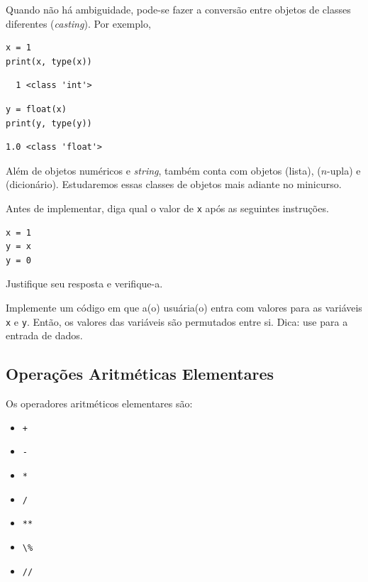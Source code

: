 \documentclass[12pt]{article}
\begin{document}
\begin{obs}
  Quando não há ambiguidade, pode-se fazer a conversão entre objetos de classes diferentes (\textit{casting}). Por exemplo,

\begin{lstlisting}
x = 1
print(x, type(x))
\end{lstlisting}

\begin{verbatim}
  1 <class 'int'>
\end{verbatim}

\begin{lstlisting}
y = float(x)
print(y, type(y))
\end{lstlisting}

\begin{verbatim}
1.0 <class 'float'>  
\end{verbatim}

\end{obs}

Além de objetos numéricos e {\it string}, {\python} também conta com objetos {\PYTHONlist} (lista), {\PYTHONtuple} ($n$-upla) e {\PYTHONdict} (dicionário). Estudaremos essas classes de objetos mais adiante no minicurso.

\begin{exr}
  Antes de implementar, diga qual o valor de \texttt{x} após as seguintes instruções.

\begin{lstlisting}
x = 1
y = x
y = 0
\end{lstlisting}

Justifique seu resposta e verifique-a.
\end{exr}

\begin{exr}
  Implemente um código em que a(o) usuária(o) entra com valores para as variáveis \texttt{x} e \texttt{y}. Então, os valores das variáveis são permutados entre si. Dica: use {\PYTHONinput} para a entrada de dados.
\end{exr}

\subsection{Operações Aritméticas Elementares}

Os operadores aritméticos elementares são:
\begin{itemize}
\item[] \lstinline-+- 
\item[] \lstinline+-+ 
\item[] \lstinline+*+ 
\item[] \lstinline+/+ 
\item[] \lstinline+**+ 
\item[] \lstinline+\%+ 
\item[] \lstinline+//+ 
\end{itemize}
\end{document}
